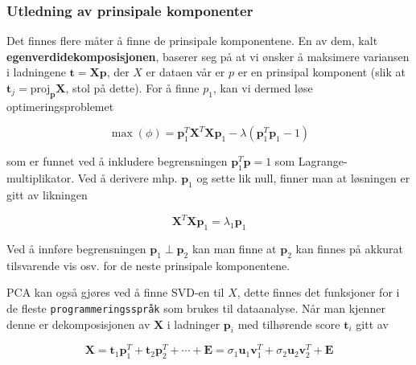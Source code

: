 \subsubsection{Utledning av prinsipale komponenter}
Det finnes flere måter å finne de prinsipale komponentene. En av dem, kalt \textbf{egenverdidekomposisjonen}, baserer seg på at vi ønsker å maksimere variansen i ladningene $\mathbf{t} = \mathbf{Xp}$, der $X$ er dataen vår er $p$ er en prinsipal komponent (slik at $\mathbf{t}_j = \textrm{proj}_{\mathbf{p}} \mathbf{X}$, stol på dette). For å finne $p_1$, kan vi dermed løse optimeringsproblemet

\begin{equation}
	\max (\phi)=\boldsymbol{p}_{1}^{T} \boldsymbol{X}^{T} \boldsymbol{X} \boldsymbol{p}_{1}-\lambda\left(\boldsymbol{p}_{1}^{T} \boldsymbol{p}_{1}-1\right)
\end{equation}

som er funnet ved å inkludere begrensningen $\mathbf{p}_1^T \mathbf{p} = 1$ som Lagrange-multiplikator. Ved å derivere mhp. $\mathbf{p}_1$ og sette lik null, finner man at løsningen er gitt av likningen

\begin{equation}
	\mathbf{X}^T \mathbf{X} \mathbf{p}_1 = \lambda_1 \mathbf{p}_1
\end{equation}

Ved å innføre begrensningen $\mathbf{p}_1 \perp \mathbf{p}_2$ kan man finne at $\mathbf{p}_2$ kan finnes på akkurat tilsvarende vis osv. for de neste prinsipale komponentene.

PCA kan også gjøres ved å finne SVD-en til $X$, dette finnes det funksjoner for i de fleste \texttt{programmeringsspråk} som brukes til dataanalyse. Når man kjenner denne er dekomposisjonen av $\mathbf{X}$ i ladninger $\mathbf{p}_i$ med tilhørende score $\mathbf{t}_i$ gitt av

\begin{equation}
	\mathbf{X} = \mathbf{t}_1 \mathbf{p}_1^T + \mathbf{t}_2 \mathbf{p}_2^T + \cdots + \mathbf{E} = \sigma_1 \mathbf{u}_1 \mathbf{v}_1^T +  \sigma_2 \mathbf{u}_2 \mathbf{v}_2^T + \mathbf{E} 
\end{equation}


